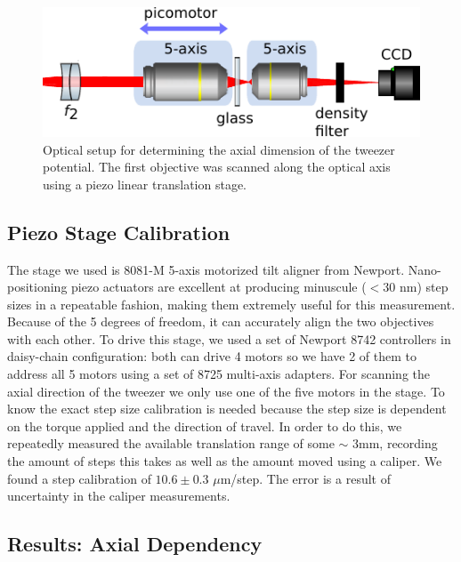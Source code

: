 \begin{figure}
    \centering
    \includegraphics[width=0.6\linewidth]{figures/ZScanSetup.pdf}
    \caption{Optical setup for determining the axial dimension of the tweezer potential. The first objective was scanned along the optical axis using a piezo linear translation stage.}
    \label{fig:ZScanSetup}
\end{figure}


\subsection{Piezo Stage Calibration}

The stage we used is 8081-M 5-axis motorized tilt aligner from Newport. 
Nano-positioning piezo actuators are excellent at producing minuscule ($<30$ nm) step sizes in a repeatable fashion, making them extremely useful for this measurement.
Because of the 5 degrees of freedom, it can accurately align the two objectives with each other. 
To drive this stage, we used a set of Newport 8742 controllers in daisy-chain configuration: both can drive 4 motors so we have 2 of them to address all 5 motors using a set of 8725 multi-axis adapters.
For scanning the axial direction of the tweezer we only use one of the five motors in the stage. 
To know the exact step size calibration is needed because the step size is dependent on the torque applied and the direction of travel.
In order to do this, we repeatedly measured the available translation range of some $\sim$ 3mm, recording the amount of steps this takes as well as the amount moved using a caliper. 
We found a step calibration of $10.6 \pm 0.3$ $\mu$m/step.
The error is a result of uncertainty in the caliper measurements. 



\subsection{Results: Axial Dependency}

